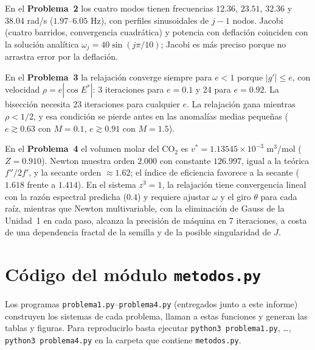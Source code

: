 \documentclass[11pt,a4paper]{article}
\begin{document}
En el \textbf{Problema~2} los cuatro modos tienen frecuencias $12.36$, $23.51$, $32.36$ y $38.04$ rad/s ($1.97$--$6.05$ Hz), con perfiles sinusoidales de $j-1$ nodos. Jacobi (cuatro barridos, convergencia cuadrática) y potencia con deflación coinciden con la solución analítica $\omega_j=40\sin(j\pi/10)$; Jacobi es más preciso porque no arrastra error por la deflación.

En el \textbf{Problema~3} la relajación converge siempre para $e<1$ porque $|g'|\le e$, con velocidad $\rho=e|\cos E^*|$: 3 iteraciones para $e=0.1$ y 24 para $e=0.92$. La bisección necesita 23 iteraciones para cualquier $e$. La relajación gana mientras $\rho<1/2$, y esa condición se pierde antes en las anomalías medias pequeñas ($e\gtrsim0.63$ con $M=0.1$, $e\gtrsim0.91$ con $M=1.5$).

En el \textbf{Problema~4} el volumen molar del CO$_2$ es $v^*=1.13545\times10^{-3}$ m$^3$/mol ($Z=0.910$). Newton muestra orden $2.000$ con constante $126.997$, igual a la teórica $f''/2f'$, y la secante orden $\approx1.62$; el índice de eficiencia favorece a la secante ($1.618$ frente a $1.414$). En el sistema $z^3=1$, la relajación tiene convergencia lineal con la razón espectral predicha ($0.4$) y requiere ajustar $\omega$ y el giro $\theta$ para cada raíz, mientras que Newton multivariable, con la eliminación de Gauss de la Unidad~1 en cada paso, alcanza la precisión de máquina en 7 iteraciones, a costa de una dependencia fractal de la semilla y de la posible singularidad de $J$.

\appendix
\section{Código del módulo \texttt{metodos.py}}
Los programas \texttt{problema1.py}--\texttt{problema4.py} (entregados junto a este informe) construyen los sistemas de cada problema, llaman a estas funciones y generan las tablas y figuras. Para reproducirlo basta ejecutar \texttt{python3 problema1.py}, \dots, \texttt{python3 problema4.py} en la carpeta que contiene \texttt{metodos.py}.

\end{document}
